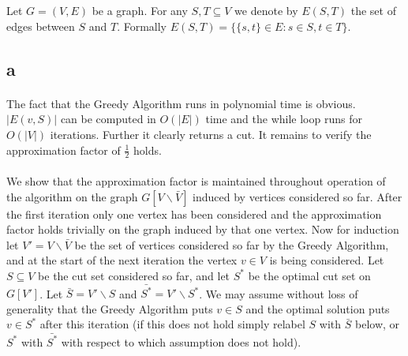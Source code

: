 \documentclass[letterpaper,12pt,oneside,onecolumn]{article}
\begin{document}
\section{}
\paragraph{}
Let $G = (V,E)$ be a graph. For any $S, T \subseteq V$ we denote by $E(S,T)$ the set of edges between $S$ and $T$. Formally $E(S,T) = \{\{s,t\} \in E: s \in S, t \in T\}$.
\subsection{a}
\paragraph{}
The fact that the Greedy Algorithm runs in polynomial time is obvious. $|E(v,S)|$ can be computed in $O(|E|)$ time and the while loop runs for $O(|V|)$ iterations. Further it clearly returns a cut. It remains to verify the approximation factor of $\frac{1}{2}$ holds.
\paragraph{}
We show that the approximation factor is maintained throughout operation of the algorithm on the graph $G[V\backslash \bar{V}]$ induced by vertices considered so far. After the first iteration only one vertex has been considered and the approximation factor holds trivially on the graph induced by that one vertex. Now for induction let $V' = V \backslash \bar{V}$ be the set of vertices considered so far by the Greedy Algorithm, and at the start of the next iteration the vertex $v \in V$ is being considered. Let $S \subseteq V$ be the cut set considered so far, and let $S^*$ be the optimal cut set on $G[V']$. Let $\bar{S} = V'\backslash S$ and $\bar{S^*} = V' \backslash S^*$. We may assume without loss of generality that the Greedy Algorithm puts $v \in S$ and the optimal solution puts $v \in S^*$ after this iteration (if this does not hold simply relabel $S$ with $\bar{S}$ below, or $S^*$ with $\bar{S^*}$ with respect to which assumption does not hold). 
\end{document}
